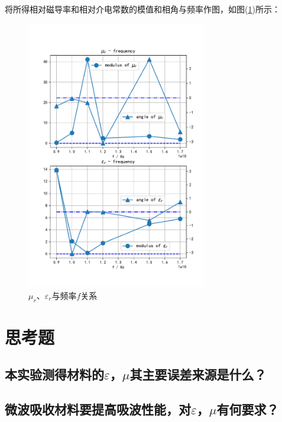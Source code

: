 \documentclass[a4paper]{article}
\begin{document}
将所得相对磁导率和相对介电常数的模值和相角与频率作图，如图(\ref{fig:data})所示：
\begin{figure}[!h]
	\centering
	\includegraphics[width=0.7\textwidth]{fig/data.pdf}
	\caption{$\mu_r$、$\varepsilon_r$与频率$f$关系}\label{fig:data}
\end{figure}

\section{思考题}
\subsection{本实验测得材料的$\varepsilon$，$\mu$其主要误差来源是什么？}
\subsection{微波吸收材料要提高吸波性能，对$\varepsilon$，$\mu$有何要求？}

\nocite{jiaocai}

\end{document}
